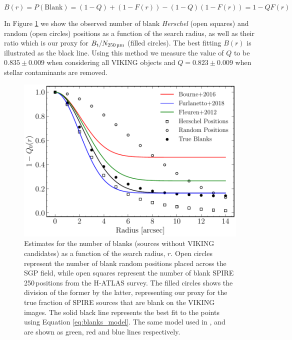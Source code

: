 \begin{equation}
    B(r) = P(\textrm{Blank}) = (1-Q) + (1-F(r)) - (1-Q)(1-F(r)) = 1 - QF(r)
\label{eq:blanks_model}
\end{equation}

In Figure \ref{fig:Q_estimate} we show the observed number of blank \textit{Herschel} (open squares) and random (open circles) positions as a function of the search radius, as well as their ratio which is our proxy for $B_{\textrm{t}}/N_{\textrm{250\,\micron}}$ (filled circles). The best fitting $B(r)$ is illustrated as the black line. Using this method we measure the value of $Q$ to be $0.835\pm0.009$ when considering all VIKING objects and $Q=0.823\pm0.009$ when stellar contaminants are removed.

\begin{figure}
    \centering
	\includegraphics[width=0.75\columnwidth]{Figures/Q_estimate.pdf}
	\caption{Estimates for the number of blanks (sources without VIKING candidates) as a function of the search radius, $r$. Open circles represent the number of blank random positions placed across the SGP field, while open squares represent the number of blank SPIRE 250\,\micron positions from the H-ATLAS survey. The filled circles shows the division of the former by the latter, representing our proxy for the true fraction of SPIRE sources that are blank on the VIKING images. The solid black line represents the best fit to the points using Equation \ref{eq:blanks_model}. The same model used in \citealt{Fleuren_2012}, \citealt{Bourne_2016} and \citealt{Furlanetto_2018} are shown as green, red and blue lines respectively.}
	\label{fig:Q_estimate}
\end{figure}

